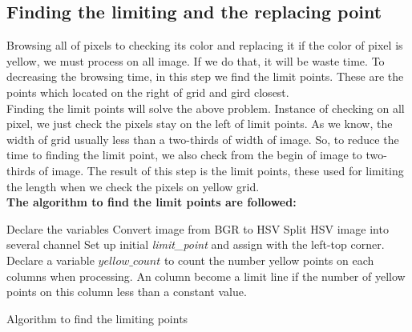 \subsection{Finding the limiting and the replacing point}
Browsing all of pixels to checking its color and replacing it if the color of pixel is yellow, we must process on all image. If we do that, it will be waste time. To decreasing the browsing time, in this step we find the limit points. These are the points which located on the right of grid and gird closest.\\
Finding the limit points will solve the above problem. Instance of checking on all pixel, we just check the pixels stay on the left of limit points. As we know, the width of grid usually less than a two-thirds of width of image. So, to reduce the time to finding the limit point, we also check from the begin of image to two-thirds of image. The result of this step is the limit points, these used for limiting the length when we check the pixels on yellow grid.\\
\textbf{The algorithm to find the limit points are followed:}\\
\begin{algorithm}[H]
\Indm
{}
\Indp
Declare the variables\;
Convert image from BGR to HSV\;
Split HSV image into several channel
Set up initial \textit{limit\_point} and assign with the left-top corner.\;
Declare a variable $yellow\_count$ to count the number yellow points on each columns when processing. An column become a limit line if the number of yellow points on this column less than a constant value.\;
\caption{Algorithm to find the limiting points}
\end{algorithm}
